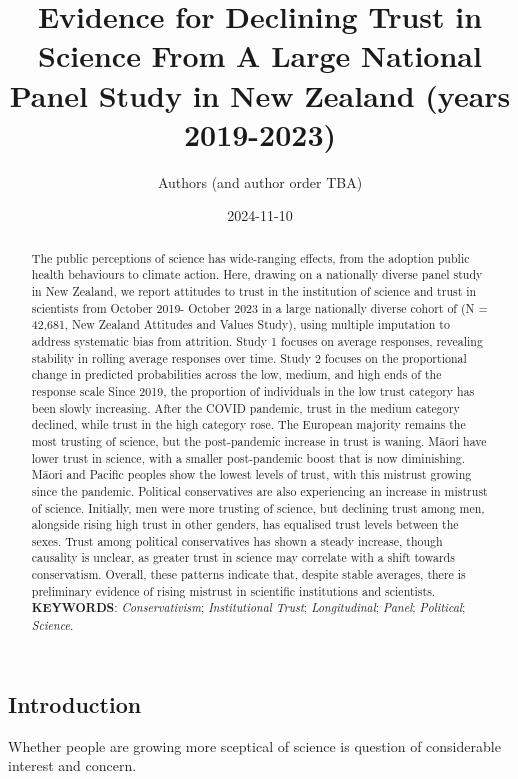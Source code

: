 \documentclass[
  single column]{article}
\title{Evidence for Declining Trust in Science From A Large National
Panel Study in New Zealand (years 2019-2023)}
\author{Authors (and author order TBA)}
\affil{%
             \small{     New Zealand
          ORCID \textcolor[HTML]{A6CE39}{\aiOrcid} ~0000-0003-3169-6576 }
              }
\date{2024-11-10}
\begin{document}
\maketitle
\begin{abstract}
The public perceptions of science has wide-ranging effects, from the
adoption public health behaviours to climate action. Here, drawing on a
nationally diverse panel study in New Zealand, we report attitudes to
trust in the institution of science and trust in scientists from October
2019- October 2023 in a large nationally diverse cohort of (N = 42,681,
New Zealand Attitudes and Values Study), using multiple imputation to
address systematic bias from attrition. Study 1 focuses on average
responses, revealing stability in rolling average responses over time.
Study 2 focuses on the proportional change in predicted probabilities
across the low, medium, and high ends of the response scale Since 2019,
the proportion of individuals in the low trust category has been slowly
increasing. After the COVID pandemic, trust in the medium category
declined, while trust in the high category rose. The European majority
remains the most trusting of science, but the post-pandemic increase in
trust is waning. Māori have lower trust in science, with a smaller
post-pandemic boost that is now diminishing. Māori and Pacific peoples
show the lowest levels of trust, with this mistrust growing since the
pandemic. Political conservatives are also experiencing an increase in
mistrust of science. Initially, men were more trusting of science, but
declining trust among men, alongside rising high trust in other genders,
has equalised trust levels between the sexes. Trust among political
conservatives has shown a steady increase, though causality is unclear,
as greater trust in science may correlate with a shift towards
conservatism. Overall, these patterns indicate that, despite stable
averages, there is preliminary evidence of rising mistrust in scientific
institutions and scientists. \textbf{KEYWORDS}: \emph{Conservativism};
\emph{Institutional Trust}; \emph{Longitudinal}; \emph{Panel};
\emph{Political}; \emph{Science}.
\end{abstract}


\subsection{Introduction}\label{introduction}

Whether people are growing more sceptical of science is question of
considerable interest and concern.
\end{document}
